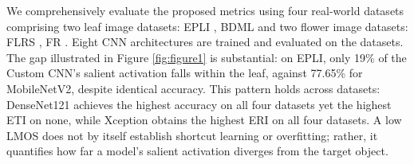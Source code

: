\documentclass[a4paper,fleqn]{cas-dc}
\begin{document}
	

	
	
	We comprehensively evaluate the proposed metrics using four real-world datasets comprising two leaf image datasets:  EPLI \cite{r26}, BDML\cite{r29} and two flower image datasets: FLRS \cite{r30}, FR \cite{r31}. 
	Eight CNN architectures are trained and evaluated on the datasets. 
	The gap illustrated in Figure \ref{fig:figure1} is substantial: on EPLI, only 19\% of the Custom CNN's salient activation falls within the leaf, against 77.65\% for MobileNetV2, despite identical accuracy. %
	This pattern holds across datasets: DenseNet121 achieves the highest accuracy on all four datasets yet the highest ETI on none, while Xception obtains the highest ERI on all four datasets.
	A low LMOS does not by itself establish shortcut learning or overfitting; rather, it quantifies how far a model’s salient activation diverges from the target object.
	
\end{document}
